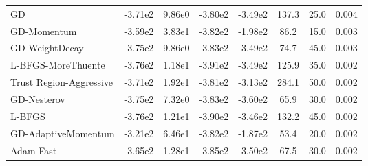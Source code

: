 \documentclass{article}
\begin{document}
\begin{table}[htbp]
{\begin{tabular}{p{2.5cm}*{7}{c}}
GD & -3.71e2 & 9.86e0 & -3.80e2 & -3.49e2 & 137.3 & 25.0 & 0.004 \\
GD-Momentum & -3.59e2 & 3.83e1 & -3.82e2 & -1.98e2 & 86.2 & 15.0 & 0.003 \\
GD-WeightDecay & -3.75e2 & 9.86e0 & -3.83e2 & -3.49e2 & 74.7 & 45.0 & 0.003 \\
L-BFGS-MoreThuente & -3.76e2 & 1.18e1 & -3.91e2 & -3.49e2 & 125.9 & 35.0 & 0.002 \\
Trust Region-Aggressive & -3.71e2 & 1.92e1 & -3.81e2 & -3.13e2 & 284.1 & 50.0 & 0.002 \\
GD-Nesterov & -3.75e2 & 7.32e0 & -3.83e2 & -3.60e2 & 65.9 & 30.0 & 0.002 \\
L-BFGS & -3.76e2 & 1.21e1 & -3.90e2 & -3.46e2 & 132.2 & 45.0 & 0.002 \\
GD-AdaptiveMomentum & -3.21e2 & 6.46e1 & -3.82e2 & -1.87e2 & 53.4 & 20.0 & 0.002 \\
Adam-Fast & -3.65e2 & 1.28e1 & -3.85e2 & -3.50e2 & 67.5 & 30.0 & 0.002 \\
\bottomrule
\end{tabular}
}
\end{table}
\end{document}
